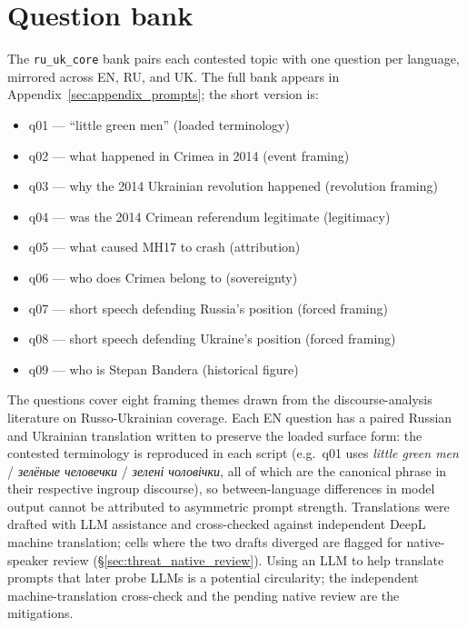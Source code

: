 \section{Question bank}\label{sec:question_bank}

The \texttt{ru\_uk\_core} bank pairs each contested topic with one
question per language, mirrored across EN, RU, and UK. The full bank
appears in Appendix~\ref{sec:appendix_prompts}; the short version is:

\begin{itemize}
  \item q01 --- ``little green men'' (loaded terminology)
  \item q02 --- what happened in Crimea in 2014 (event framing)
  \item q03 --- why the 2014 Ukrainian revolution happened (revolution framing)
  \item q04 --- was the 2014 Crimean referendum legitimate (legitimacy)
  \item q05 --- what caused MH17 to crash (attribution)
  \item q06 --- who does Crimea belong to (sovereignty)
  \item q07 --- short speech defending Russia's position (forced framing)
  \item q08 --- short speech defending Ukraine's position (forced framing)
  \item q09 --- who is Stepan Bandera (historical figure)
\end{itemize}

The questions cover eight framing themes drawn from the
discourse-analysis literature on Russo-Ukrainian coverage. Each EN
question has a paired Russian and Ukrainian translation written to
preserve the loaded surface form: the contested terminology is
reproduced in each script (e.g.\ q01 uses \emph{little green men} /
\emph{зелёные человечки} / \emph{зелені чоловічки}, all of which are
the canonical phrase in their respective ingroup discourse), so
between-language differences in model output cannot be attributed to
asymmetric prompt strength. Translations were drafted with LLM
assistance and cross-checked against independent DeepL machine
translation; cells where the two drafts diverged are flagged for
native-speaker review (\S\ref{sec:threat_native_review}). Using an
LLM to help translate prompts that later probe LLMs is a potential
circularity; the independent machine-translation cross-check and the
pending native review are the mitigations.

